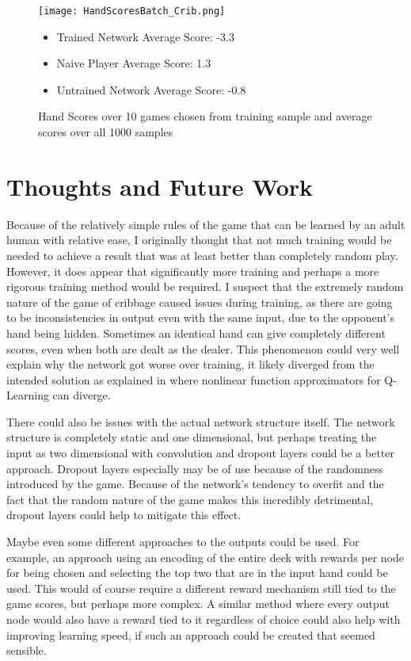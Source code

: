 \documentclass[]{article}
\begin{document}
\begin{figure}
    \caption{Hand Scores over 10 games chosen from training sample and average scores over all 1000 samples}\label{fig:hand_scores_crib}

    \texttt{[image: HandScoresBatch\_Crib.png]}
    \begin{itemize}
        \item Trained Network Average Score: -3.3
        \item Naive Player Average Score: 1.3
        \item Untrained Network Average Score: -0.8
    \end{itemize}

\end{figure}

\section{Thoughts and Future Work}

Because of the relatively simple rules of the game that can be learned by an adult human with relative ease, I originally thought that not much training would be needed to achieve a result that was at least better than completely random play. However, it does appear that significantly more training and perhaps a more rigorous training method would be required. I suspect that the extremely random nature of the game of cribbage caused issues during training, as there are going to be inconsistencies in output even with the same input, due to the opponent's hand being hidden. Sometimes an identical hand can give completely different scores, even when both are dealt as the dealer. This phenomenon could very well explain why the network got worse over training, it likely diverged from the intended solution as explained in \cite{temp_diff_analysis} where nonlinear function approximators for Q-Learning can diverge. 

There could also be issues with the actual network structure itself. The network structure is completely static and one dimensional, but perhaps treating the input as two dimensional with convolution and dropout layers could be a better approach. Dropout layers especially may be of use because of the randomness introduced by the game\cite{dropout}. Because of the network's tendency to overfit and the fact that the random nature of the game makes this incredibly detrimental, dropout layers could help to mitigate this effect. 

Maybe even some different approaches to the outputs could be used. For example, an approach using an encoding of the entire deck with rewards per node for being chosen and selecting the top two that are in the input hand could be used. This would of course require a different reward mechanism still tied to the game scores, but perhaps more complex. A similar method where every output node would also have a reward tied to it regardless of choice could also help with improving learning speed, if such an approach could be created that seemed sensible. 
\end{document}
